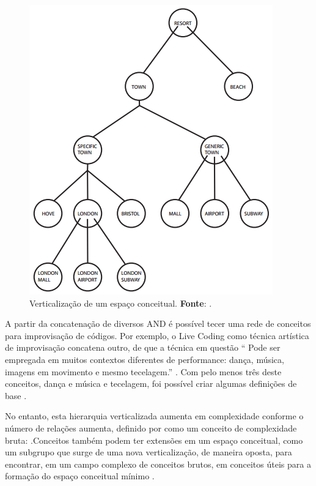 \begin{figure}[!h]
  \centering
  \includegraphics[scale=0.55]{imagens/rede1.png}
  \caption{Verticalização de um espaço conceitual. \textbf{Fonte}: .}
  \label{fig:rede1}
\end{figure}

 A partir da concatenação de diversos AND é possível tecer uma rede de conceitos para improvisação de códigos. Por exemplo, o Live Coding como técnica artística de improvisação concatena outro, de que a técnica em questão `` Pode ser empregada em muitos contextos diferentes de performance: dança, música, imagens em movimento e mesmo tecelagem.'' . Com pelo menos três deste conceitos, dança e música e tecelagem, foi possível criar algumas definições de base .

No entanto, esta hierarquia verticalizada aumenta em complexidade conforme o número de relações aumenta, definido por  como um conceito de complexidade bruta: .Conceitos também podem ter extensões em um espaço conceitual, como um subgrupo que surge de uma nova verticalização, de maneira oposta, para encontrar, em um campo complexo de conceitos brutos, em conceitos úteis para a formação do espaço conceitual mínimo .

